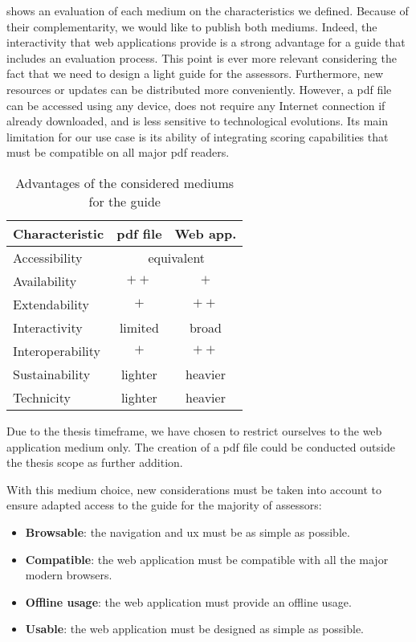  shows an evaluation of each medium on the characteristics we defined. Because of their complementarity, we would like to publish both mediums. Indeed, the interactivity that web applications provide is a strong advantage for a guide that includes an evaluation process. This point is ever more relevant considering the fact that we need to design a light guide for the assessors. Furthermore, new resources or updates can be distributed more conveniently. However, a \gls{pdf} file can be accessed using any device, does not require any Internet connection if already downloaded, and is less sensitive to technological evolutions. Its main limitation for our use case is its ability of integrating scoring capabilities that must be compatible on all major \gls{pdf} readers.

\begin{table}[ht]
    \begin{center}
        \begin{tabular}{l|cc}
            \toprule[0.8mm]
            \textbf{Characteristic} & \textbf{\gls{pdf} file} & \textbf{Web app.} \\ 
            \midrule[0.8mm]
            Accessibility & \multicolumn{2}{c}{equivalent} \\
            Availability & $\pmb{++}$ & $\pmb{+}$ \\
            Extendability & $\pmb{+}$ & $\pmb{++}$ \\
            Interactivity & limited & broad \\
            Interoperability & $\pmb{+}$ & $\pmb{++}$ \\
            Sustainability & lighter & heavier \\
            Technicity & lighter & heavier \\
            \bottomrule[0.8mm]
        \end{tabular}
    \end{center}
    \caption{Advantages of the considered mediums for the guide}
    \label{table:proposal_format_medium}
\end{table}

Due to the thesis timeframe, we have chosen to restrict ourselves to the web application medium only. The creation of a \gls{pdf} file could be conducted outside the thesis scope as further addition.

With this medium choice, new considerations must be taken into account to ensure adapted access to the guide for the majority of assessors: 
\begin{itemize}
    \item \textbf{Browsable}: the navigation and \gls{ux} must be as simple as possible.
    \item \textbf{Compatible}: the web application must be compatible with all the major modern browsers.
    \item \textbf{Offline usage}: the web application must provide an offline usage.
    \item \textbf{Usable}: the web application must be designed as simple as possible.
\end{itemize}


